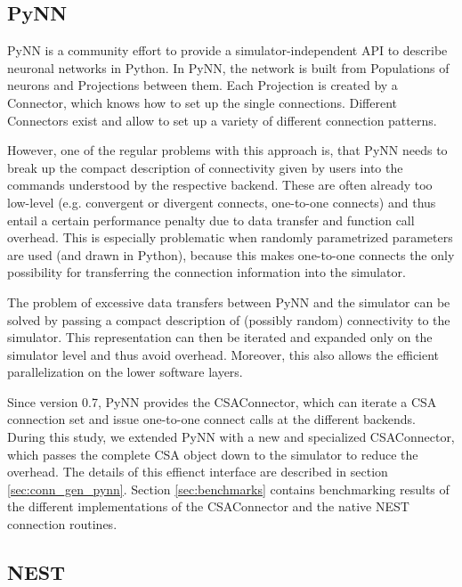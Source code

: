 \documentclass{frontiersSCNS} %
\begin{document}

\subsection{PyNN}

PyNN \citep[http://www.neuralensemble.org/PyNN;][]{Davison09} is a
community effort to provide a simulator-independent API to describe
neuronal networks in Python. In PyNN, the network is built from
Populations of neurons and Projections between them. Each Projection
is created by a Connector, which knows how to set up the single
connections. Different Connectors exist and allow to set up a variety
of different connection patterns.

However, one of the regular problems with this approach is, that PyNN
needs to break up the compact description of connectivity given by
users into the commands understood by the respective backend. These
are often already too low-level (e.g. convergent or divergent
connects, one-to-one connects) and thus entail a certain performance
penalty due to data transfer and function call overhead. This is
especially problematic when randomly parametrized parameters are used
(and drawn in Python), because this makes one-to-one connects the only
possibility for transferring the connection information into the
simulator.

The problem of excessive data transfers between PyNN and the simulator
can be solved by passing a compact description of (possibly random)
connectivity to the simulator. This representation can then be
iterated and expanded only on the simulator level and thus avoid
overhead. Moreover, this also allows the efficient parallelization on
the lower software layers.

Since version 0.7, PyNN provides the CSAConnector, which can iterate a
CSA connection set and issue one-to-one connect calls at the different
backends. During this study, we extended PyNN with a new and
specialized CSAConnector, which passes the complete CSA object down to
the simulator to reduce the overhead. The details of this effienct
interface are described in section \ref{sec:conn_gen_pynn}. Section
\ref{sec:benchmarks} contains benchmarking results of the different
implementations of the CSAConnector and the native NEST connection
routines.

\subsection{NEST}
\end{document}
